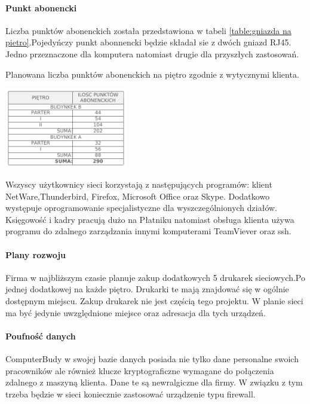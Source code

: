 \documentclass{report}
\begin{document}
\paragraph{Punkt abonencki} Liczba punktów abonenckich została przedstawiona w tabeli \ref{table:gniazda na pietro}.Pojedyńczy punkt
abonnencki będzie składał sie z dwóch gniazd RJ45. Jedno przeznaczone dla komputera natomiast drugie dla przyszłych zastosowań.

\begin{table}[H]

\centering
\caption{Planowana liczba punktów abonenckich na piętro zgodnie z wytycznymi klienta. \label{table:gniazda na pietro}}

\includegraphics[width=0.4\textwidth]{./obrazki/plany_wew/gniazda_na_pietro.png} 
 
\end{table}


Wszyscy użytkownicy sieci korzystają z następujących programów: klient NetWare,Thunderbird, Firefox, Microsoft Office oraz Skype. Dodatkowo występuje 
oprogramowanie specjalistyczne dla wyszczególnionych działów. Księgowość i kadry pracują dużo na Płatniku natomiast obsługa klienta używa programu
do zdalnego zarządzania innymi komputerami TeamViever oraz ssh.

\paragraph{Plany rozwoju}Firma w najbliższym czasie planuje zakup dodatkowych 5 drukarek sieciowych.Po jednej dodatkowej na każde piętro. Drukarki te mają znajdować się
w ogólnie dostępnym miejscu. Zakup drukarek nie jest częścią tego projektu. W planie sieci ma być jedynie uwzględnione miejsce oraz adresacja dla tych urządzeń.

\paragraph{Poufność danych}ComputerBudy w swojej bazie danych posiada nie tylko dane personalne swoich pracowników ale również klucze kryptograficzne wymagane do połączenia zdalnego
z maszyną klienta. Dane te są newralgiczne dla firmy. W związku z tym trzeba będzie w sieci koniecznie zastosować urządzenie typu firewall.
\end{document}
